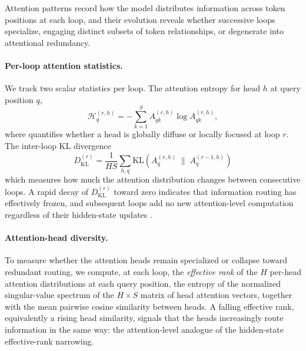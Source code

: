\documentclass{llmxive}
\begin{document}
Attention patterns record how the model distributes information across token positions at each loop, and their evolution reveals whether successive loops specialize, engaging distinct subsets of token relationships, or degenerate into attentional redundancy.

\paragraph{Per-loop attention statistics.}
We track two scalar statistics per loop.
The attention entropy for head $h$ at query position $q$,
\begin{equation}
  \mathcal{H}^{(r,h)}_q = -\sum_{k=1}^S
    A^{(r,h)}_{qk} \log A^{(r,h)}_{qk},
  \label{eq:attn-entropy}
\end{equation}
where quantifies whether a head is globally diffuse or locally focused at loop $r$.
The inter-loop KL divergence
\begin{equation}
  D_{\text{KL}}^{(r)} = \frac{1}{HS}\sum_{h,q}
    \mathrm{KL}\!\left(A^{(r,h)}_q \;\|\; A^{(r-1,h)}_q\right)
  \label{eq:attn-div}
\end{equation}
which measures how much the attention distribution changes between consecutive loops.
A rapid decay of $D_{\text{KL}}^{(r)}$ toward zero indicates that
information routing has effectively frozen, and subsequent loops add no new
attention-level computation regardless of their hidden-state updates
\citep{lu2025latent}.

\paragraph{Attention-head diversity.}
To measure whether the attention heads remain specialized or collapse toward
redundant routing, we compute, at each loop, the \emph{effective rank} of the
$H$ per-head attention distributions at each query position, the entropy of
the normalized singular-value spectrum of the $H\times S$ matrix of head
attention vectors, together with the mean pairwise cosine similarity between
heads. A falling effective rank, equivalently a rising head similarity, signals
that the heads increasingly route information in the same way: the
attention-level analogue of the hidden-state effective-rank narrowing.
\end{document}
